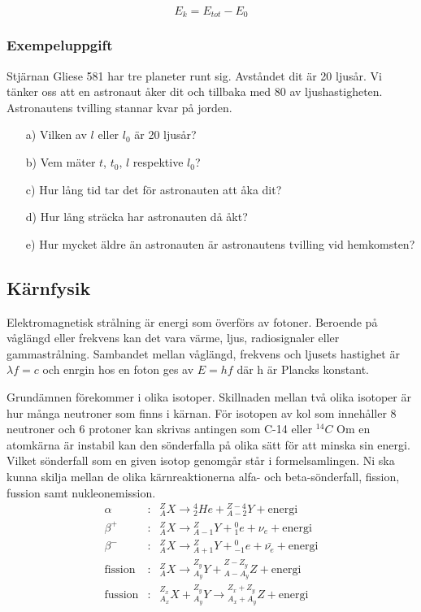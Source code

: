 \documentclass[10pt, titlepage, oneside, a4paper]{article}
\newcommand{\Subsection}[1]{\vspace{-4pt}\subsection{#1}\vspace{-8pt}}
\newcommand{\Subsubsection}[1]{\vspace{-4pt}\subsubsection{#1}\vspace{-8pt}}
\begin{document}
    \begin{equation}
        E_k = E_{tot} - E_{0}
    \end{equation}

    \Subsubsection{Exempeluppgift}
    Stjärnan Gliese 581 har tre planeter runt sig. Avståndet dit är 20
    ljusår. Vi tänker oss att en astronaut åker dit och tillbaka med 80 %
    av ljushastigheten. Astronautens tvilling stannar kvar på jorden.
    \begin{itemize}
        \item[a)] Vilken av $l$ eller $l_0$ är 20 ljusår?
        \item[b)] Vem mäter $t$, $t_0$, $l$ respektive $l_0$?
        \item[c)] Hur lång tid tar det för astronauten att åka dit?
        \item[d)] Hur lång sträcka har astronauten då åkt?
        \item[e)] Hur mycket äldre än astronauten är astronautens tvilling vid hemkomsten?
    \end{itemize}
    \newpage
    \Subsection{Kärnfysik}
    Elektromagnetisk strålning är energi som överförs av fotoner. Beroende på våglängd eller frekvens kan det vara värme,
    ljus, radiosignaler eller gammastrålning. Sambandet mellan våglängd, frekvens och ljusets hastighet är $\lambda f = c$
    och enrgin hos en foton ges av $E = h f$ där h är Plancks konstant.

    Grundämnen förekommer i olika isotoper. Skillnaden mellan två olika isotoper är hur många neutroner som finns i kärnan.
    För isotopen av kol som innehåller 8 neutroner och 6 protoner kan skrivas antingen som C-14 eller ${}_{\phantom6}^{14}C$
    Om en atomkärna är instabil kan den sönderfalla på olika sätt för att minska sin energi. Vilket sönderfall som en given
    isotop genomgår står i formelsamlingen. Ni ska kunna skilja mellan de olika kärnreaktionerna alfa- och beta-sönderfall,
    fission, fussion samt nukleonemission.
    \begin{eqnarray}
        \alpha &:& {}_{A}^{Z}X \to  {}_{2}^{4}He + {}_{A-2}^{Z-4}Y + \text{energi}\\
        \beta^+ &:& {}_{A}^{Z}X \to {}_{A-1}^{Z}Y + {}_{1}^{0}e + \nu_e + \text{energi}\\
        \beta^- &:& {}_{A}^{Z}X \to {}_{A+1}^{Z}Y + {}_{-1}^{0}e + \bar{\nu_e} + \text{energi}\\
        \text{fission} &:& {}_{A}^{Z}X \to {}_{A_y}^{Z_y}Y + {}_{A - A_y}^{Z - Z_y}Z + \text{energi}\\
        \text{fussion} &:& {}_{A_x}^{Z_x}X + {}_{A_y}^{Z_y}Y \to {}_{A_x+A_y}^{Z_x+Z_y}Z +\text{energi}
    \end{eqnarray}
\end{document}
